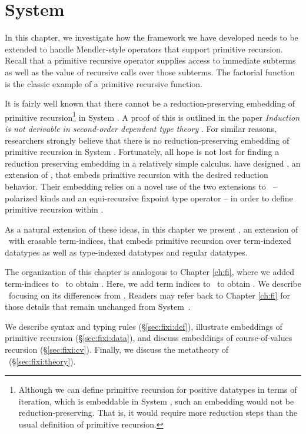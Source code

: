 \chapter{System \Fixi}\label{ch:fixi}
In this chapter, we investigate how the framework we have developed
needs to be extended to handle Mendler-style operators that support
primitive recursion. Recall that a primitive recursive operator supplies
access to immediate subterms as well as the value of recursive calls over
those subterms. The factorial function is the classic example of
a primitive recursive function.

It is fairly well known that there cannot be a reduction-preserving embedding
of primitive recursion\footnote{
	Although we can define primitive recursion for positive datatypes
	in terms of iteration, which is embeddable in System \F, such an
	embedding would not be reduction-preserving. That is, it would require
	more reduction steps than the usual definition of primitive recursion.}
in System \F. A proof of this is outlined in the paper 
\textit{Induction is not derivable in second-order dependent type theory}
\cite{Geuvers01}. For similar reasons, researchers strongly believe that
there is no reduction-preserving embedding of primitive recursion 
in System \Fw. Fortunately, all hope is not lost for finding
a reduction preserving embedding in a relatively simple calculus. 
\citet{AbeMat04} have designed \Fixw, an extension of \Fw,
that embeds primitive recursion with the desired reduction behavior.
Their embedding relies on a novel use of the two extensions to \Fw\ --
polarized kinds and an equi-recursive fixpoint type operator --
in order to define primitive recursion within \Fixw.

As a natural extension of these ideas, in this chapter we present \Fixi,
an extension of \Fixw\ with erasable term-indices, that embeds
primitive recursion over term-indexed datatypes as well as
type-indexed datatypes and regular datatypes.

The organization of this chapter is analogous to Chapter \ref{ch:fi},
where we added term-indices to \Fw\ to obtain \Fi. Here, we add
term indices to \Fixw\ to obtain \Fixi. We describe \Fixi\ focusing on
its differences from \Fi. Readers may refer back to Chapter \ref{ch:fi}
for those details that remain unchanged from System~\Fi.

We describe syntax and typing rules (\S\ref{sec:fixi:def}),
illustrate embeddings of primitive recursion (\S\ref{sec:fixi:data}),
and discuss embeddings of course-of-values recursion (\S\ref{sec:fixi:cv}).
Finally, we discuss the metatheory of \Fixi\ (\S\ref{sec:fixi:theory}).





